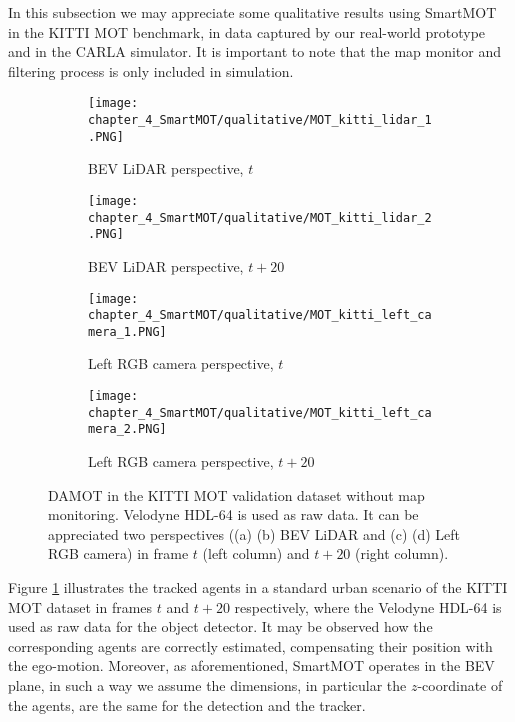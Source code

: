 In this subsection we may appreciate some qualitative results using SmartMOT in the KITTI \ac{MOT} benchmark, in data captured by our real-world prototype and in the \ac{CARLA} simulator. It is important to note that the map monitor and filtering process is only included in simulation. 

\begin{figure}[!h]
	\centering
	\begin{subfigure}{0.45\textwidth}
		\captionsetup{justification=centering}
		\texttt{[image: chapter\_4\_SmartMOT/qualitative/MOT\_kitti\_lidar\_1.PNG]}
		\caption{\ac{BEV} \ac{LiDAR} perspective, $t$}
	\end{subfigure}
	\hfill
	\begin{subfigure}{0.45\textwidth}
		\captionsetup{justification=centering}
		\texttt{[image: chapter\_4\_SmartMOT/qualitative/MOT\_kitti\_lidar\_2.PNG]}
		\caption{\ac{BEV} \ac{LiDAR} perspective, $t+20$}
	\end{subfigure}
	\hfill
	\begin{subfigure}{0.45\textwidth}
		\captionsetup{justification=centering}
		\texttt{[image: chapter\_4\_SmartMOT/qualitative/MOT\_kitti\_left\_camera\_1.PNG]}
		\caption{Left RGB camera perspective, $t$}
	\end{subfigure}
	\hfill
	\begin{subfigure}{0.45\textwidth}
		\captionsetup{justification=centering}
		\texttt{[image: chapter\_4\_SmartMOT/qualitative/MOT\_kitti\_left\_camera\_2.PNG]}
		\caption{Left RGB camera perspective, $t+20$}
	\end{subfigure}
	\captionsetup{justification=justified}
	\caption[\ac{DAMOT} in the KITTI \ac{MOT} validation dataset without map monitoring]{\ac{DAMOT} in the KITTI \ac{MOT} validation dataset without map monitoring. Velodyne HDL-64 is used as raw data. It can be appreciated two perspectives ((a) (b) \ac{BEV} \ac{LiDAR} and (c) (d) Left RGB camera) in frame $t$ (left column) and $t+20$ (right column).}
	\label{fig:chapter_4_SmartMOT/MOT_KITTI}
\end{figure}

Figure \ref{fig:chapter_4_SmartMOT/MOT_KITTI} illustrates the tracked agents in a standard urban scenario of the KITTI \ac{MOT} dataset in frames $t$ and $t+20$ respectively, where the Velodyne HDL-64 is used as raw data for the object detector. It may be observed how the corresponding agents are correctly estimated, compensating their position with the ego-motion. Moreover, as aforementioned, SmartMOT operates in the \ac{BEV} plane, in such a way we assume the dimensions, in particular the $z$-coordinate of the agents, are the same for the detection and the tracker.

